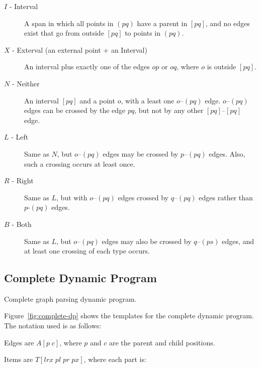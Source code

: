 \begin{description}
  \item[$I$ - Interval]
  A span in which all points in $(pq)$ have a parent in $[pq]$, and no edges exist that go from outside $[pq]$ to points in $(pq)$.
  \item[$X$ - Exterval (an external point + an Interval)]
  An interval plus exactly one of the edges $op$ or $oq$, where $o$ is outside $[pq]$.
  \item[$N$ - Neither]
  An interval $[pq]$ and a point $o$, with a least one $o$--$(pq)$ edge.
  $o$--$(pq)$ edges can be crossed by the edge $pq$, but not by any other $[pq]$--$[pq]$ edge.
  \item[$L$ - Left]
  Same as $N$, but $o$--$(pq)$ edges may be crossed by $p$--$(pq)$ edges. Also, such a crossing occurs at least once. 
  \item[$R$ - Right]
  Same as $L$, but with $o$--$(pq)$ edges crossed by $q$--$(pq)$ edges rather than $p$-$(pq)$ edges.
  \item[$B$ - Both]
  Same as $L$, but $o$--$(pq)$ edges may also be crossed by $q$--$(ps)$ edges, and at least one crossing of each type occurs.
\end{description}

\subsection{Complete Dynamic Program}

\begin{algorithm}
\vspace{-2mm}

\vspace{-10mm}
\caption{
  \label{fig:complete-dp}
  Complete graph parsing dynamic program.
}
\end{algorithm}

Figure~\ref{fig:complete-dp} shows the templates for the complete dynamic program.
The notation used is as follows:

\noindent
Edges are $A[p \; c]$, where $p$ and $c$ are the parent and child positions.

\noindent
Items are $T[lrx \; pl \; pr \; px]$, where each part is:

